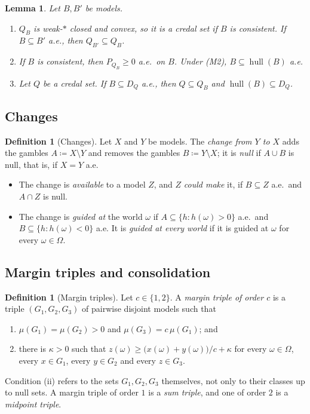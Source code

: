 \documentclass[11pt]{article}
\newcommand{\hull}{\operatorname{hull}}
\theoremstyle{plain}
\newtheorem{lemma}[theorem]{Lemma}
\theoremstyle{definition}
\newtheorem{definition}[theorem]{Definition}
\begin{document}
\begin{lemma}\label{lem:hull}
Let $B,B'$ be models.
\begin{enumerate}[label=(\alph*)]
  \item $Q_B$ is weak-$\ast$ closed and convex, so it is a credal set if $B$ is consistent. If
  $B\subseteq B'$ a.e., then $Q_{B'}\subseteq Q_B$.
  \item If $B$ is consistent, then $P_{Q_B}\ge0$ a.e.\ on $B$. Under (M2), $B\subseteq\hull(B)$
  a.e.
  \item Let $Q$ be a credal set. If $B\subseteq D_Q$ a.e., then $Q\subseteq Q_B$ and
  $\hull(B)\subseteq D_Q$.
\end{enumerate}
\end{lemma}

\subsection{Changes}

\begin{definition}[Changes]\label{def:change}
Let $X$ and $Y$ be models. The \emph{change from $Y$ to $X$} adds the gambles
$A\coloneqq X\setminus Y$ and removes the gambles $B\coloneqq Y\setminus X$; it is \emph{null}
if $A\cup B$ is null, that is, if $X=Y$ a.e.
\begin{itemize}
  \item The change is \emph{available} to a model $Z$, and $Z$ \emph{could make} it, if
  $B\subseteq Z$ a.e.\ and $A\cap Z$ is null.
  \item The change is \emph{guided at} the world $\omega$ if $A\subseteq\{h:h(\omega)>0\}$
  a.e.\ and $B\subseteq\{h:h(\omega)<0\}$ a.e. It is \emph{guided at every world} if it is
  guided at $\omega$ for every $\omega\in\Omega$.
\end{itemize}
\end{definition}

\subsection{Margin triples and consolidation}

\begin{definition}[Margin triples]\label{def:triple}
Let $c\in\{1,2\}$. A \emph{margin triple of order $c$} is a triple $(G_1,G_2,G_3)$ of pairwise
disjoint models such that
\begin{enumerate}[label=(\roman*)]
  \item $\mu(G_1)=\mu(G_2)>0$ and $\mu(G_3)=c\,\mu(G_1)$; and
  \item there is $\kappa>0$ such that $z(\omega)\ge\bigl(x(\omega)+y(\omega)\bigr)/c+\kappa$ for
  every $\omega\in\Omega$, every $x\in G_1$, every $y\in G_2$ and every $z\in G_3$.
\end{enumerate}
Condition (ii) refers to the sets $G_1,G_2,G_3$ themselves, not only to their classes up to
null sets. A margin triple of order $1$ is a \emph{sum triple}, and one of order $2$ is a
\emph{midpoint triple}.
\end{definition}
\end{document}
